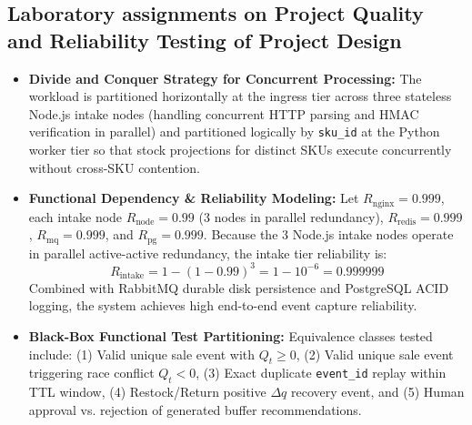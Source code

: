 \documentclass[oneside,a4paper,12pt]{report}
\begin{document}
\begin{appendices}
\chapter{Laboratory assignments on Project Quality and Reliability Testing of Project Design}
\begin{itemize}
  \item \textbf{Divide and Conquer Strategy for Concurrent Processing:}
  The workload is partitioned horizontally at the ingress tier across three stateless Node.js intake nodes (handling concurrent HTTP parsing and HMAC verification in parallel) and partitioned logically by \texttt{sku\_id} at the Python worker tier so that stock projections for distinct SKUs execute concurrently without cross-SKU contention.
  \item \textbf{Functional Dependency \& Reliability Modeling:}
  Let $R_{\text{nginx}} = 0.999$, each intake node $R_{\text{node}} = 0.99$ (3 nodes in parallel redundancy), $R_{\text{redis}} = 0.999$, $R_{\text{mq}} = 0.999$, and $R_{\text{pg}} = 0.999$. Because the 3 Node.js intake nodes operate in parallel active-active redundancy, the intake tier reliability is:
  \begin{equation}
  R_{\text{intake}} = 1 - (1 - 0.99)^3 = 1 - 10^{-6} = 0.999999
  \end{equation}
  Combined with RabbitMQ durable disk persistence and PostgreSQL ACID logging, the system achieves high end-to-end event capture reliability.
  \item \textbf{Black-Box Functional Test Partitioning:}
  Equivalence classes tested include: (1) Valid unique sale event with $Q_t \ge 0$, (2) Valid unique sale event triggering race conflict $Q_t < 0$, (3) Exact duplicate \texttt{event\_id} replay within TTL window, (4) Restock/Return positive $\Delta q$ recovery event, and (5) Human approval vs. rejection of generated buffer recommendations.
\end{itemize}


\end{appendices}
\end{document}
